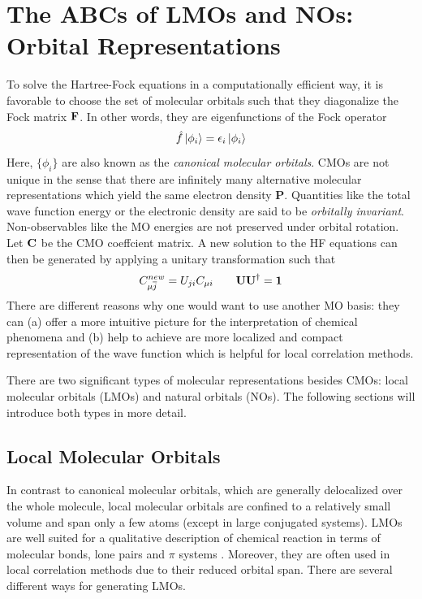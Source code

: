 \section{The ABCs of LMOs and NOs: Orbital Representations \label{sec:ABCLMO}}

To solve the Hartree-Fock equations in a computationally efficient way, it is favorable to choose the set of molecular orbitals such that they diagonalize the Fock matrix $\mathbf{F}$. In other words, they are eigenfunctions of the Fock operator
\begin{equation}
\hat{f}\ket{\smash{\phi_i}} = \epsilon_i \ket{\smash{\phi_i}}
\end{equation} 
\noindent Here, $\{\phi_i\}$ are also known as the \emph{canonical molecular orbitals}. CMOs are not unique in the sense that there are infinitely many alternative molecular representations which yield the same electron density $\mathbf{P}$. Quantities like the total wave function energy or the electronic density are said to be \emph{orbitally invariant}. Non-observables like the MO energies are not preserved under orbital rotation. Let $\mathbf{C}$ be the CMO coeffcient matrix. A new solution to the HF equations can then be generated by applying a unitary transformation such that
\begin{equation}
C^{new}_{\mu \overline{j}} = U_{ji} C_{\mu i} \qquad \mathbf{UU}^{\dagger} = \mathbf{1}
\end{equation} 
\noindent There are different reasons why one would want to use another MO basis: they can (a) offer a more intuitive picture for the interpretation of chemical phenomena and (b) help to achieve are more localized and compact representation of the wave function which is helpful for local correlation methods.

There are two significant types of molecular representations besides CMOs: local molecular orbitals (LMOs) and natural orbitals (NOs). The following sections will introduce both  types in more detail.

\subsection{Local Molecular Orbitals}

In contrast to canonical molecular orbitals, which are generally delocalized over the whole molecule, local molecular orbitals are confined to a relatively small volume and span only a few atoms (except in large conjugated systems). LMOs are well suited for a qualitative description of chemical reaction in terms of molecular bonds, lone pairs and $\pi$ systems \cite{Ste2019}. Moreover, they are often used in local correlation methods due to their reduced orbital span. There are several different ways for generating LMOs.

